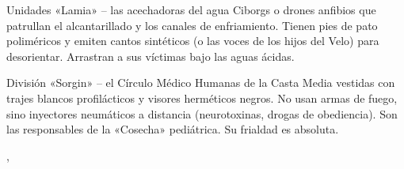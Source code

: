 \begin{FichaEnemigo}{Unidades «Lamia» -- las acechadoras del agua}
Ciborgs o drones anfibios que patrullan el alcantarillado y los canales de enfriamiento. Tienen pies de pato poliméricos y emiten cantos sintéticos (o las voces de los hijos del Velo) para desorientar. Arrastran a sus víctimas bajo las aguas ácidas.
\end{FichaEnemigo}

\begin{FichaEnemigo}{División «Sorgin» -- el Círculo Médico}
Humanas de la Casta Media vestidas con trajes blancos profilácticos y visores herméticos negros. No usan armas de fuego, sino inyectores neumáticos a distancia (neurotoxinas, drogas de obediencia). Son las responsables de la «Cosecha» pediátrica. Su frialdad es absoluta.\par
{} , 
\end{FichaEnemigo}

